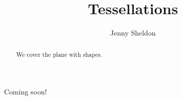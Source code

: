 \documentclass{ximera}
\title{Tessellations}
\author{Jenny Sheldon}
\begin{document}
\begin{abstract}
We cover the plane with shapes.
\end{abstract}
\maketitle

Coming soon!
\end{document}
